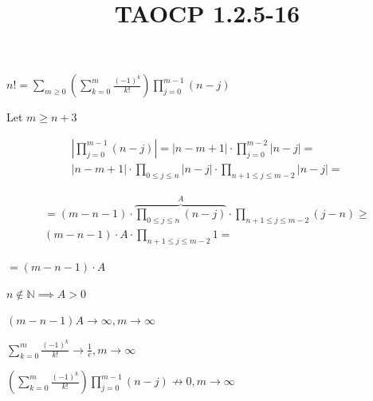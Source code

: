 \documentclass{article}
\title{TAOCP 1.2.5\mbox{-}16}
\begin{document}
\maketitle

\( n! = \sum_{m \geq 0}(\sum_{k=0}^{m} \frac{{(-1)}^{k}}{k!})\prod_{j=0}^{m-1}(n-j) \)

Let \( m \geq n + 3 \)

\begin{multline*}
|\prod_{j=0}^{m-1}(n-j)| = |n-m+1| \cdot \prod_{j=0}^{m-2}|n-j| = \\
|n-m+1| \cdot \prod_{0 \leq j \leq n} |n-j| \cdot \prod_{n + 1 \leq j \leq m - 2} |n-j| =
\end{multline*}

\begin{multline*}
= (m-n-1) \cdot \overbrace{\prod_{0 \leq j \leq n} (n-j)}^{A} \cdot \prod_{n + 1 \leq j \leq m - 2} (j - n) \geq \\
(m-n-1) \cdot A \cdot \prod_{n + 1 \leq j \leq m - 2} 1 =
\end{multline*}

\( = (m-n-1) \cdot A \)

\( n \notin \mathbb{N} \implies A > 0 \)

\( (m-n-1)A \to \infty, m\to\infty \)

\( \sum_{k=0}^{m} \frac{{(-1)}^{k}}{k!} \to \frac{1}{e}, m \to \infty \)

\( (\sum_{k=0}^{m} \frac{{(-1)}^{k}}{k!})\prod_{j=0}^{m-1}(n-j) \not\to 0, m \to \infty \)
\end{document}
